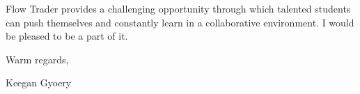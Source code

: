 \documentclass[a4paper,11pt]{article}
\begin{document}
Flow Trader provides a challenging opportunity through which talented students can push themselves
and constantly learn in a collaborative environment. I would be pleased to be a part of it. \par

Warm regards, \par

Keegan Gyoery
\end{document}
